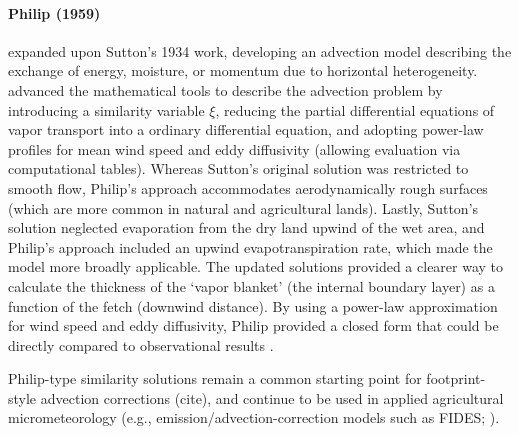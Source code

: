 \documentclass{article}
\begin{document}
    \paragraph{Philip (1959)} 
    \citet{philip1959theory} expanded upon Sutton's 1934 work, developing an advection model describing the exchange of energy, moisture, or momentum due to horizontal heterogeneity.
    \citet{philip1959theory} advanced the mathematical tools to describe the advection problem by introducing a similarity variable  $\xi$, reducing the partial differential equations of vapor transport into a ordinary differential equation, and adopting power-law profiles for mean wind speed and eddy diffusivity (allowing evaluation via computational tables). 
    Whereas Sutton’s original solution was restricted to smooth flow, Philip’s approach accommodates aerodynamically rough    surfaces (which are more common in natural and agricultural lands). 
    Lastly, Sutton’s solution neglected evaporation from the dry land upwind of the wet area, and Philip's approach  included an upwind evapotranspiration rate, which made the model more broadly applicable.
     The updated solutions provided a clearer way to calculate the thickness of the `vapor blanket' (the internal boundary layer) as a function of the fetch (downwind distance). By using a power-law approximation for wind speed and eddy diffusivity, Philip provided a closed form that could be directly compared to observational results \cite{brutsaert2013evaporation}.
    
    Philip-type similarity solutions remain a common starting point for footprint-style advection corrections (cite), and continue to be used in applied agricultural micrometeorology (e.g., emission/advection-correction models such as FIDES; \cite{loubet2018fides}).
    
\end{document}
